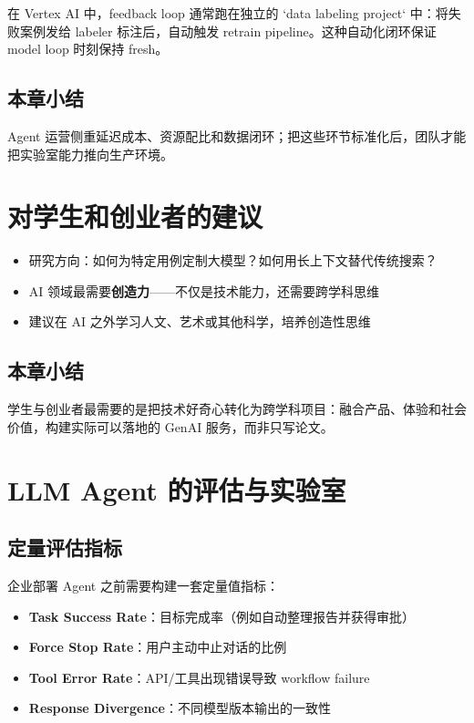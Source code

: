\documentclass[a4paper]{article}
\begin{document}
在 Vertex AI 中，feedback loop 通常跑在独立的 `data labeling project` 中：将失败案例发给 labeler 标注后，自动触发 retrain pipeline。这种自动化闭环保证 model loop 时刻保持 fresh。

\subsection{本章小结}

Agent 运营侧重延迟成本、资源配比和数据闭环；把这些环节标准化后，团队才能把实验室能力推向生产环境。

\section{对学生和创业者的建议}

\begin{itemize}
    \item 研究方向：如何为特定用例定制大模型？如何用长上下文替代传统搜索？
    \item AI 领域最需要\textbf{创造力}——不仅是技术能力，还需要跨学科思维
    \item 建议在 AI 之外学习人文、艺术或其他科学，培养创造性思维
\end{itemize}

\subsection{本章小结}

学生与创业者最需要的是把技术好奇心转化为跨学科项目：融合产品、体验和社会价值，构建实际可以落地的 GenAI 服务，而非只写论文。

\section{LLM Agent 的评估与实验室}

\subsection{定量评估指标}

企业部署 Agent 之前需要构建一套定量值指标：

\begin{itemize}
    \item \textbf{Task Success Rate}：目标完成率（例如自动整理报告并获得审批）
    \item \textbf{Force Stop Rate}：用户主动中止对话的比例
    \item \textbf{Tool Error Rate}：API/工具出现错误导致 workflow failure
    \item \textbf{Response Divergence}：不同模型版本输出的一致性
\end{itemize}
\end{document}
